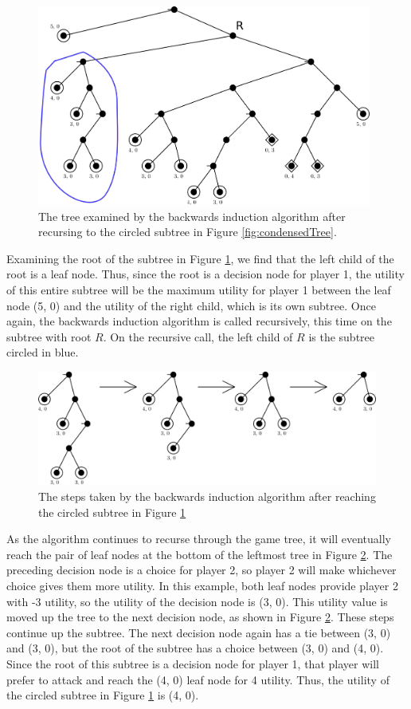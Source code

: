 \begin{figure}[H]
  \centering
  \includegraphics[width=11cm]{figures/Backwards1.png}
  \caption{The tree examined by the backwards induction algorithm after recursing to the circled subtree in Figure \ref{fig:condensedTree}.}
  \label{fig:backwards1}
\end{figure}
Examining the root of the subtree in Figure \ref{fig:backwards1}, we find that the left child of the root is a leaf node. Thus, since the root is a decision node for player 1, the utility of this entire subtree will be the maximum utility for player 1 between the leaf node (5, 0) and the utility of the right child, which is its own subtree. Once again, the backwards induction algorithm is called recursively, this time on the subtree with root $R$. On the recursive call, the left child of $R$ is the subtree circled in blue.\\

\begin{figure}[H]
  \centering
  \includegraphics[width=12cm]{figures/Backwards2.png}
  \caption{The steps taken by the backwards induction algorithm after reaching the circled subtree in Figure \ref{fig:backwards1}}
  \label{fig:backwards2}
\end{figure}
As the algorithm continues to recurse through the game tree, it will eventually reach the pair of leaf nodes at the bottom of the leftmost tree in Figure \ref{fig:backwards2}. The preceding decision node is a choice for player 2, so player 2 will make whichever choice gives them more utility. In this example, both leaf nodes provide player 2 with -3 utility, so the utility of the decision node is (3, 0). This utility value is moved up the tree to the next decision node, as shown in Figure \ref{fig:backwards2}. These steps continue up the subtree. The next decision node again has a tie between (3, 0) and (3, 0), but the root of the subtree has a choice between (3, 0) and (4, 0). Since the root of this subtree is a decision node for player 1, that player will prefer to attack and reach the (4, 0) leaf node for 4 utility. Thus, the utility of the circled subtree in Figure \ref{fig:backwards1} is (4, 0).\\

